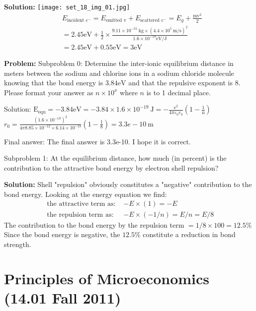 \documentclass[10pt]{article}
\begin{document}
\textbf{Solution:}
\texttt{[image: set\_18\_img\_01.jpg]}
\nonessentialimage
\[
\begin{aligned}
&E_{\text {incident } e^{-}}=E_{\text {emitted } \mathrm{v}}+E_{\text {scattered } e^{-}}=E_{g}+\frac{\mathrm{mv}^{2}}{2} \\
&=2.45 \mathrm{eV}+\frac{1}{2} \times \frac{9.11 \times 10^{-31} \mathrm{~kg} \times\left(4.4 \times 10^{5} \mathrm{~m} / \mathrm{s}\right)^{2}}{1.6 \times 10^{-19} \mathrm{eV} / \mathrm{J}} \\
&=2.45 \mathrm{eV}+0.55 \mathrm{eV}=\boxed{3} \mathrm{eV}
\end{aligned}
\]


\textbf{Problem:}
Subproblem 0: Determine the inter-ionic equilibrium distance in meters between the sodium and chlorine ions in a sodium chloride molecule knowing that the bond energy is $3.84 \mathrm{eV}$ and that the repulsive exponent is 8. Please format your answer as $n \times 10^x$ where $n$ is to 1 decimal place.


Solution: $\mathrm{E}_{\mathrm{equ}}=-3.84 \mathrm{eV}=-3.84 \times 1.6 \times 10^{-19} \mathrm{~J}=-\frac{\mathrm{e}^{2}}{4 \pi \varepsilon_{0} r_{0}}\left(1-\frac{1}{\mathrm{n}}\right)$
\\
$r_{0}=\frac{\left(1.6 \times 10^{-19}\right)^{2}}{4 \pi 8.85 \times 10^{-12} \times 6.14 \times 10^{-19}}\left(1-\frac{1}{8}\right)= 
\boxed{3.3e-10} \mathrm{~m}$

Final answer: The final answer is 3.3e-10. I hope it is correct.

Subproblem 1: At the equilibrium distance, how much (in percent) is the contribution to the attractive bond energy by electron shell repulsion?


\textbf{Solution:}
Shell "repulsion" obviously constitutes a "negative" contribution to the bond energy. Looking at the energy equation we find:
\[
\begin{array}{ll}
\text { the attractive term as: } & -E \times(1)=-E \\
\text { the repulsion term as: } & -E \times(-1 / n)=E / n=E / 8
\end{array}
\]
The contribution to the bond energy by the repulsion term $=1 / 8 \times 100 = \boxed{12.5}\%$ Since the bond energy is negative, the $12.5 \%$ constitute a reduction in bond strength.


\section{Principles of Microeconomics (14.01 Fall 2011)}
\end{document}
